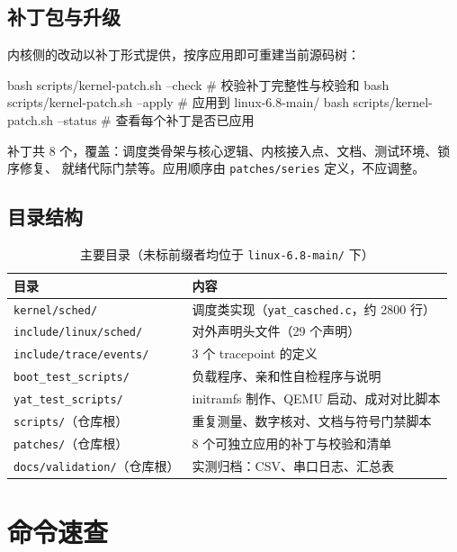 \documentclass[11pt,a4paper]{article}
\newcommand{\code}[1]{\texttt{#1}}
\newenvironment{shell}{\Verbatim[fontsize=\small,frame=single,framesep=4pt]}{\endVerbatim}
\begin{document}
\subsection{补丁包与升级}

内核侧的改动以补丁形式提供，按序应用即可重建当前源码树：

\begin{shell}
bash scripts/kernel-patch.sh --check      # 校验补丁完整性与校验和
bash scripts/kernel-patch.sh --apply      # 应用到 linux-6.8-main/
bash scripts/kernel-patch.sh --status     # 查看每个补丁是否已应用
\end{shell}

补丁共 8 个，覆盖：调度类骨架与核心逻辑、内核接入点、文档、测试环境、锁序修复、
就绪代际门禁等。应用顺序由 \code{patches/series} 定义，不应调整。

\subsection{目录结构}

\begin{table}[H]
\centering
\caption{主要目录（未标前缀者均位于 \code{linux-6.8-main/} 下）}
\label{tab:dirs}
\small
\begin{tabular}{@{}p{3.9cm}p{10.1cm}@{}}
\toprule
目录 & 内容 \\
\midrule
\code{kernel/sched/} & 调度类实现（\code{yat\_casched.c}，约 2800 行） \\
\code{include/linux/sched/} & 对外声明头文件（29 个声明） \\
\code{include/trace/events/} & 3 个 tracepoint 的定义 \\
\code{boot\_test\_scripts/} & 负载程序、亲和性自检程序与说明 \\
\code{yat\_test\_scripts/} & initramfs 制作、QEMU 启动、成对对比脚本 \\
\code{scripts/}（仓库根） & 重复测量、数字核对、文档与符号门禁脚本 \\
\code{patches/}（仓库根） & 8 个可独立应用的补丁与校验和清单 \\
\code{docs/validation/}（仓库根） & 实测归档：CSV、串口日志、汇总表 \\
\bottomrule
\end{tabular}
\end{table}

\appendix

\section{命令速查}
\end{document}
